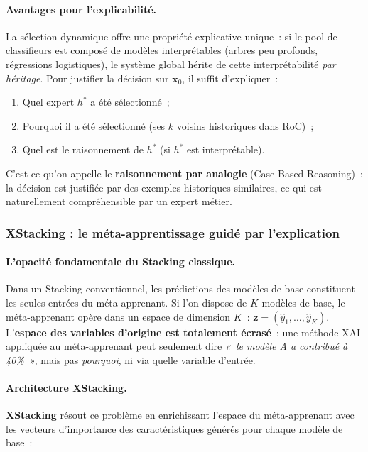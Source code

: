 \paragraph{Avantages pour l'explicabilité.}

La sélection dynamique offre une propriété explicative unique~: si le pool de classifieurs
est composé de modèles interprétables (arbres peu profonds, régressions logistiques),
le système global hérite de cette interprétabilité \textit{par héritage}. Pour justifier
la décision sur $\mathbf{x}_0$, il suffit d'expliquer~:
\begin{enumerate}
  \item Quel expert $h^*$ a été sélectionné~;
  \item Pourquoi il a été sélectionné (ses $k$ voisins historiques dans RoC)~;
  \item Quel est le raisonnement de $h^*$ (si $h^*$ est interprétable).
\end{enumerate}
C'est ce qu'on appelle le \textbf{raisonnement par analogie} (Case-Based Reasoning)~:
la décision est justifiée par des exemples historiques similaires, ce qui est naturellement
compréhensible par un expert métier.

\subsubsection{XStacking : le méta-apprentissage guidé par l'explication}

\paragraph{L'opacité fondamentale du Stacking classique.}

Dans un Stacking conventionnel, les prédictions des modèles de base constituent les
seules entrées du méta-apprenant. Si l'on dispose de $K$ modèles de base, le méta-apprenant
opère dans un espace de dimension $K$~: $\mathbf{z} = (\hat{y}_1, \ldots, \hat{y}_K)$.
L'\textbf{espace des variables d'origine est totalement écrasé}~: une méthode XAI appliquée
au méta-apprenant peut seulement dire \textit{«~le modèle A a contribué à 40\%~»}, mais
pas \textit{pourquoi}, ni via quelle variable d'entrée.

\paragraph{Architecture XStacking.}

\textbf{XStacking} résout ce problème en enrichissant l'espace du méta-apprenant avec
les vecteurs d'importance des caractéristiques générés pour chaque modèle de base~:

